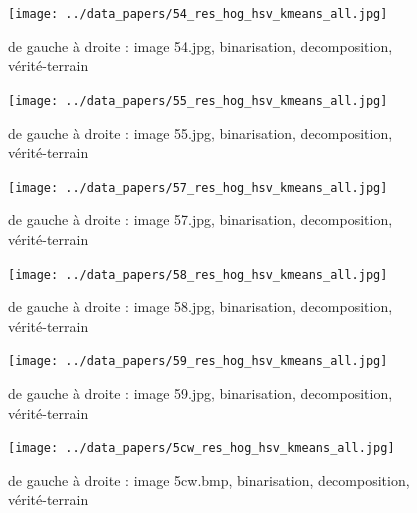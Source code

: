 \documentclass{book}
\begin{document}
\begin{figure}[H]
\begin{center}
\texttt{[image: ../data\_papers/54\_res\_hog\_hsv\_kmeans\_all.jpg]}
\end{center}
\caption{de gauche à droite : image 54.jpg, binarisation, decomposition, vérité-terrain}
\label{54}
\end{figure}
\clearpage


\begin{figure}[H]
\begin{center}
\texttt{[image: ../data\_papers/55\_res\_hog\_hsv\_kmeans\_all.jpg]}
\end{center}
\caption{de gauche à droite : image 55.jpg, binarisation, decomposition, vérité-terrain}
\label{55}
\end{figure}
\clearpage


\begin{figure}[H]
\begin{center}
\texttt{[image: ../data\_papers/57\_res\_hog\_hsv\_kmeans\_all.jpg]}
\end{center}
\caption{de gauche à droite : image 57.jpg, binarisation, decomposition, vérité-terrain}
\label{57}
\end{figure}
\clearpage


\begin{figure}[H]
\begin{center}
\texttt{[image: ../data\_papers/58\_res\_hog\_hsv\_kmeans\_all.jpg]}
\end{center}
\caption{de gauche à droite : image 58.jpg, binarisation, decomposition, vérité-terrain}
\label{58}
\end{figure}
\clearpage


\begin{figure}[H]
\begin{center}
\texttt{[image: ../data\_papers/59\_res\_hog\_hsv\_kmeans\_all.jpg]}
\end{center}
\caption{de gauche à droite : image 59.jpg, binarisation, decomposition, vérité-terrain}
\label{59}
\end{figure}
\clearpage


\begin{figure}[H]
\begin{center}
\texttt{[image: ../data\_papers/5cw\_res\_hog\_hsv\_kmeans\_all.jpg]}
\end{center}
\caption{de gauche à droite : image 5cw.bmp, binarisation, decomposition, vérité-terrain}
\label{5cw}
\end{figure}
\clearpage
\end{document}
